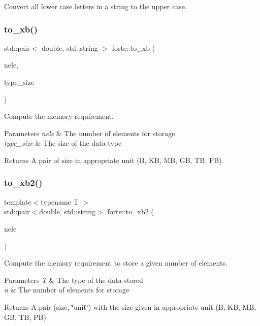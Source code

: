 Convert all lower case letters in a string to the upper case. 

\mbox{\label{namespaceforte_aa21124a23161d9425c07b72fc074430d}} 
\subsubsection{\texorpdfstring{to\+\_\+xb()}{to\_xb()}}
{\footnotesize\ttfamily std\+::pair$<$ double, std\+::string $>$ forte\+::to\+\_\+xb (\begin{DoxyParamCaption}\item[{size\+\_\+t}]{nele,  }\item[{size\+\_\+t}]{type\+\_\+size }\end{DoxyParamCaption})}



Compute the memory requirement. 


\begin{DoxyParams}{Parameters}
{\em nele} & The number of elements for storage \\
\hline
{\em type\+\_\+size} & The size of the data type \\
\hline
\end{DoxyParams}
\begin{DoxyReturn}{Returns}
A pair of size in appropriate unit (B, KB, MB, GB, TB, PB) 
\end{DoxyReturn}
\mbox{\label{namespaceforte_ad877252a810292bf926b25d5e4dd198e}} 
\subsubsection{\texorpdfstring{to\+\_\+xb2()}{to\_xb2()}}
{\footnotesize\ttfamily template$<$typename T $>$ \\
std\+::pair$<$double, std\+::string$>$ forte\+::to\+\_\+xb2 (\begin{DoxyParamCaption}\item[{size\+\_\+t}]{nele }\end{DoxyParamCaption})}



Compute the memory requirement to store a given number of elements. 


\begin{DoxyParams}{Parameters}
{\em T} & The type of the data stored \\
\hline
{\em n} & The number of elements for storage \\
\hline
\end{DoxyParams}
\begin{DoxyReturn}{Returns}
A pair (size, \char`\"{}unit\char`\"{}) with the size given in appropriate unit (B, KB, MB, GB, TB, PB) 
\end{DoxyReturn}
\mbox{\label{namespaceforte_af6e74dbb13765642ce142840ee088140}} 
